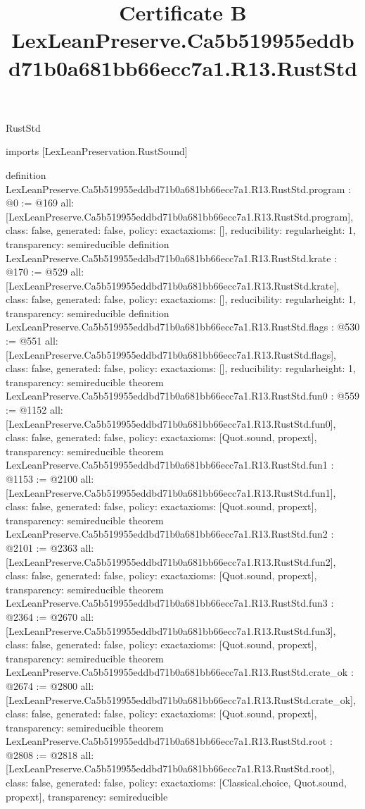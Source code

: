 \begin{lexlean}{RustStd}
\title{Certificate B LexLeanPreserve.Ca5b519955eddbd71b0a681bb66ecc7a1.R13.RustStd}
\begin{coremodule}
imports [LexLeanPreservation.RustSound]

definition LexLeanPreserve.Ca5b519955eddbd71b0a681bb66ecc7a1.R13.RustStd.program : @0 := @169 {
  all: [LexLeanPreserve.Ca5b519955eddbd71b0a681bb66ecc7a1.R13.RustStd.program],
  class: false,
  generated: false,
  policy: exact{axioms: []},
  reducibility: regular{height: 1},
  transparency: semireducible
}
definition LexLeanPreserve.Ca5b519955eddbd71b0a681bb66ecc7a1.R13.RustStd.krate : @170 := @529 {
  all: [LexLeanPreserve.Ca5b519955eddbd71b0a681bb66ecc7a1.R13.RustStd.krate],
  class: false,
  generated: false,
  policy: exact{axioms: []},
  reducibility: regular{height: 1},
  transparency: semireducible
}
definition LexLeanPreserve.Ca5b519955eddbd71b0a681bb66ecc7a1.R13.RustStd.flags : @530 := @551 {
  all: [LexLeanPreserve.Ca5b519955eddbd71b0a681bb66ecc7a1.R13.RustStd.flags],
  class: false,
  generated: false,
  policy: exact{axioms: []},
  reducibility: regular{height: 1},
  transparency: semireducible
}
theorem LexLeanPreserve.Ca5b519955eddbd71b0a681bb66ecc7a1.R13.RustStd.fun0 : @559 := @1152 {
  all: [LexLeanPreserve.Ca5b519955eddbd71b0a681bb66ecc7a1.R13.RustStd.fun0],
  class: false,
  generated: false,
  policy: exact{axioms: [Quot.sound, propext]},
  transparency: semireducible
}
theorem LexLeanPreserve.Ca5b519955eddbd71b0a681bb66ecc7a1.R13.RustStd.fun1 : @1153 := @2100 {
  all: [LexLeanPreserve.Ca5b519955eddbd71b0a681bb66ecc7a1.R13.RustStd.fun1],
  class: false,
  generated: false,
  policy: exact{axioms: [Quot.sound, propext]},
  transparency: semireducible
}
theorem LexLeanPreserve.Ca5b519955eddbd71b0a681bb66ecc7a1.R13.RustStd.fun2 : @2101 := @2363 {
  all: [LexLeanPreserve.Ca5b519955eddbd71b0a681bb66ecc7a1.R13.RustStd.fun2],
  class: false,
  generated: false,
  policy: exact{axioms: [Quot.sound, propext]},
  transparency: semireducible
}
theorem LexLeanPreserve.Ca5b519955eddbd71b0a681bb66ecc7a1.R13.RustStd.fun3 : @2364 := @2670 {
  all: [LexLeanPreserve.Ca5b519955eddbd71b0a681bb66ecc7a1.R13.RustStd.fun3],
  class: false,
  generated: false,
  policy: exact{axioms: [Quot.sound, propext]},
  transparency: semireducible
}
theorem LexLeanPreserve.Ca5b519955eddbd71b0a681bb66ecc7a1.R13.RustStd.crate_ok : @2674 := @2800 {
  all: [LexLeanPreserve.Ca5b519955eddbd71b0a681bb66ecc7a1.R13.RustStd.crate_ok],
  class: false,
  generated: false,
  policy: exact{axioms: [Quot.sound, propext]},
  transparency: semireducible
}
theorem LexLeanPreserve.Ca5b519955eddbd71b0a681bb66ecc7a1.R13.RustStd.root : @2808 := @2818 {
  all: [LexLeanPreserve.Ca5b519955eddbd71b0a681bb66ecc7a1.R13.RustStd.root],
  class: false,
  generated: false,
  policy: exact{axioms: [Classical.choice, Quot.sound, propext]},
  transparency: semireducible
}


\end{coremodule}
\end{lexlean}
